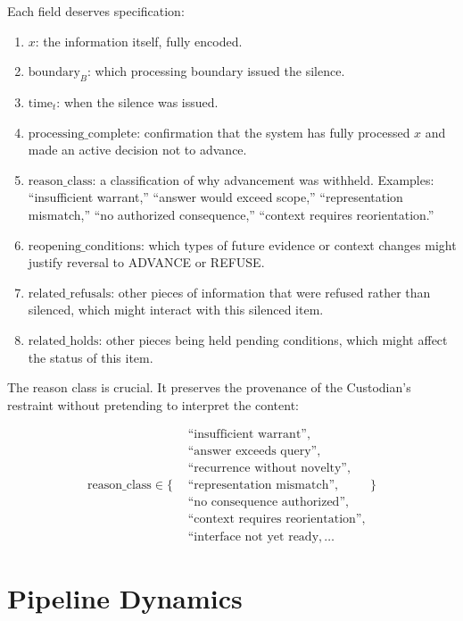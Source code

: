 \documentclass[12pt]{article}
\begin{document}
Each field deserves specification:

\begin{enumerate}
\item $x$: the information itself, fully encoded.
\item $\text{boundary}_B$: which processing boundary issued the silence.
\item $\text{time}_t$: when the silence was issued.
\item $\text{processing\_complete}$: confirmation that the system has fully processed $x$ and made an active decision not to advance.
\item $\text{reason\_class}$: a classification of why advancement was withheld. Examples: ``insufficient warrant,'' ``answer would exceed scope,'' ``representation mismatch,'' ``no authorized consequence,'' ``context requires reorientation.''
\item $\text{reopening\_conditions}$: which types of future evidence or context changes might justify reversal to ADVANCE or REFUSE.
\item $\text{related\_refusals}$: other pieces of information that were refused rather than silenced, which might interact with this silenced item.
\item $\text{related\_holds}$: other pieces being held pending conditions, which might affect the status of this item.
\end{enumerate}

The reason class is crucial. It preserves the provenance of the Custodian's restraint without pretending to interpret the content:

\begin{equation}
\text{reason\_class} \in \{
\begin{aligned}
&\text{``insufficient warrant''},\\
&\text{``answer exceeds query''},\\
&\text{``recurrence without novelty''},\\
&\text{``representation mismatch''},\\
&\text{``no consequence authorized''},\\
&\text{``context requires reorientation''},\\
&\text{``interface not yet ready},\ldots
\end{aligned}
\}
\end{equation}

\section{Pipeline Dynamics}
\end{document}
